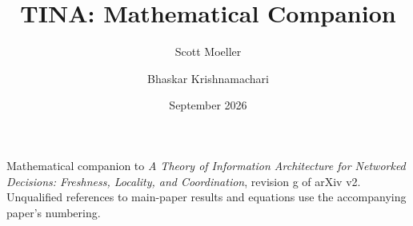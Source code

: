 \documentclass[11pt]{article}
\begin{document}
\title{TINA: Mathematical Companion}
\author{Scott Moeller \and Bhaskar Krishnamachari}
\date{September 2026}
\maketitle
\noindent Mathematical companion to \emph{A Theory of Information Architecture for Networked
Decisions: Freshness, Locality, and Coordination}, revision g of arXiv v2.
Unqualified references to main-paper results and equations use the accompanying paper's numbering.


\end{document}
